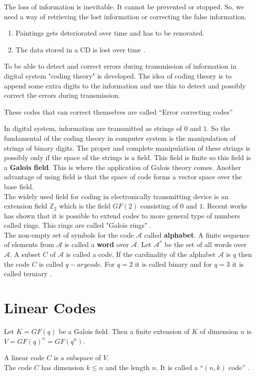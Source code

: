 The loss of information is inevitable. It cannot be prevented or stopped. So, we need a way of retrieving the lost information or correcting the false information.

\begin{enumerate}
\item Paintings gets deteriorated over time and has to be renovated.
\item The data stored in a CD is lost over time \cite{coding}.
\end{enumerate}

To be able to detect and correct errors during transmission of information in digital system "coding theory" is developed. The idea of coding theory is to append some extra digits to the information and use this to detect and possibly correct the errors during transmission.
\begin{definition} \cite{coding}
  These codes that can correct themselves are called ``Error correcting codes''
\end{definition}
In digital system, information are transmitted as strings of \(0\) and \(1\). So the fundamental of the coding theory in computer system is the manipulation of strings of binary digits. The proper and complete manipulation of these strings is possibly only if the space of the strings is a field. This field is finite so this field is a \textbf{Galois field}. This is where the application of Galois theory comes.
Another advantage of using field is that the space of code forms a vector space over the base field. \\
The widely used field for coding in electronically transmitting device is an extension field \({\mathbb{Z}}_2\) which is the field \(GF(2)\) consisting of \(0\) and \(1\). Recent works has shown that it is possible to extend codes to more general type of numbers called rings. This rings are called "Galois rings" \cite{error_correct}.\\

The non-empty set of symbols for the code \(\mathcal{A}\) called \textbf{alphabet}. A finite sequence of elements from \(\mathcal{A}\) is called a \textbf{word} over \(\mathcal{A}\). Let \(\mathcal{A}^*\) be the set of all words over \(\mathcal{A}\). A subset \(C\) of \(\mathcal{A}\) is called a code.
If the cardinality of the alphabet \(\mathcal{A}\) is \(q\) then the code \(C\) is called \(q-ary code\). For \(q=2\) it is called binary and for \(q=3\) it is called terniary \cite{error_correct}.

\section{Linear Codes}
Let \(K=GF(q)\) be a Galois field. Then a finite extension of \(K\) of dimension \(n\) is \(V=GF(q)^n=GF(q^n)\).
\begin{definition} \cite{coding}
  A linear code \(C\) is a subspace of \(V\). \\
  The code \(C\) has dimension \(k \leq n\) and the length \(n\). It is called a ``\((n,k)\) code'' \cite{error_correct}.
\end{definition}

